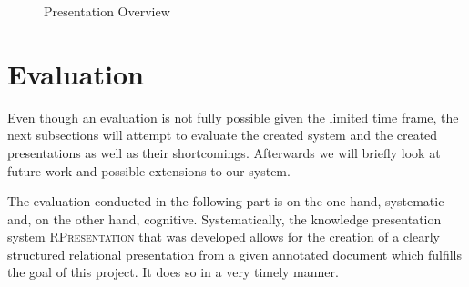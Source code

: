 \documentclass[twoside, 12pt]{article}
\newcommand{\sys}{\textsc{RPresentation}\xspace}
\begin{document}


\begin{figure}
\vspace{-26pt}
  \begin{center}
\vspace{-5pt}
  \caption{Presentation Overview}
  \label{fig:fullPresentation}
\vspace{12pt}
  \end{center}
\end{figure}

\begin{figure}
\vspace{-50pt}
\end{figure}


\section{Evaluation}
\label{sec:eval}

Even though an evaluation is not fully possible given the limited time frame, the next subsections will attempt to evaluate the created system and the created presentations as well as their shortcomings. Afterwards we will briefly look at future work and possible extensions to our system.

The evaluation conducted in the following part is on the one hand, systematic and, on the other hand, cognitive. Systematically, the knowledge presentation system \sys that was developed allows for the creation of a clearly structured relational presentation from a given annotated document which fulfills the goal of this project. It does so in a very timely manner.

\end{document}
